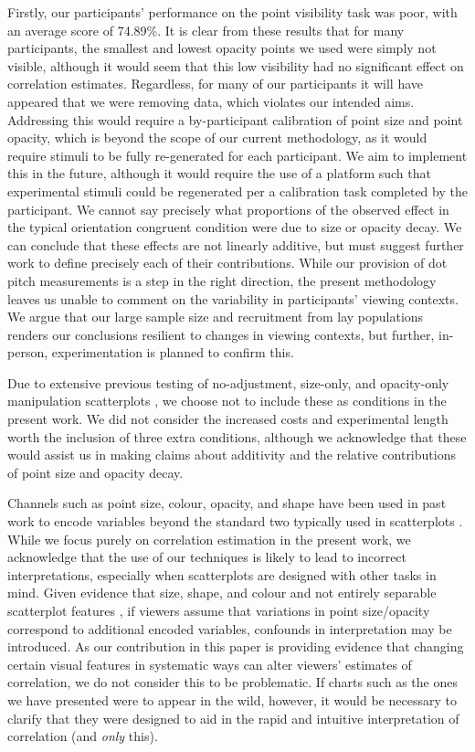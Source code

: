 \documentclass[manuscript, review, anonymous, screen]{acmart}
\begin{document}
Firstly, our participants' performance on the point visibility task was
poor, with an average score of 74.89\%. It is clear from these results
that for many participants, the smallest and lowest opacity points we
used were simply not visible, although it would seem that this low
visibility had no significant effect on correlation estimates.
Regardless, for many of our participants it will have appeared that we
were removing data, which violates our intended aims. Addressing this
would require a by-participant calibration of point size and point
opacity, which is beyond the scope of our current methodology, as it
would require stimuli to be fully re-generated for each participant. We
aim to implement this in the future, although it would require the use
of a platform such that experimental stimuli could be regenerated per a
calibration task completed by the participant. We cannot say precisely
what proportions of the observed effect in the typical orientation
congruent condition were due to size or opacity decay. We can conclude
that these effects are not linearly additive, but must suggest further
work to define precisely each of their contributions. While our
provision of dot pitch measurements is a step in the right direction,
the present methodology leaves us unable to comment on the variability
in participants' viewing contexts. We argue that our large sample size
and recruitment from lay populations renders our conclusions resilient
to changes in viewing contexts, but further, in-person, experimentation
is planned to confirm this.

Due to extensive previous testing of no-adjustment, size-only, and
opacity-only manipulation scatterplots
\citep{strain_2023, strain_2023b}, we choose not to include these as
conditions in the present work. We did not consider the increased costs
and experimental length worth the inclusion of three extra conditions,
although we acknowledge that these would assist us in making claims
about additivity and the relative contributions of point size and
opacity decay.

Channels such as point size, colour, opacity, and shape have been used
in past work to encode variables beyond the standard two typically used
in scatterplots \citep{hong_2021, smart_2019}. While we focus purely on
correlation estimation in the present work, we acknowledge that the use
of our techniques is likely to lead to incorrect interpretations,
especially when scatterplots are designed with other tasks in mind.
Given evidence that size, shape, and colour and not entirely separable
scatterplot features \citep{smart_2019}, if viewers assume that
variations in point size/opacity correspond to additional encoded
variables, confounds in interpretation may be introduced. As our
contribution in this paper is providing evidence that changing certain
visual features in systematic ways can alter viewers' estimates of
correlation, we do not consider this to be problematic. If charts such
as the ones we have presented were to appear in the wild, however, it
would be necessary to clarify that they were designed to aid in the
rapid and intuitive interpretation of correlation (and \emph{only}
this).
\end{document}
